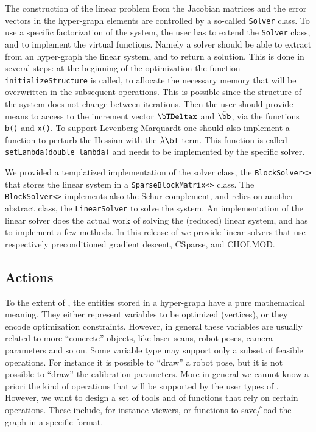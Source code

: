 \documentclass[a4paper]{article}
\begin{document}
The construction of the linear problem from the Jacobian matrices and the error vectors
in the hyper-graph elements are controlled by a so-called \verb+Solver+ class.
To use a specific factorization of the system, the user has to extend the
\verb+Solver+ class, and to implement the virtual functions. 
Namely a solver should be able to extract from an
hyper-graph the linear system, and to return a solution.  This is
done in several steps: at the beginning of the optimization the
function \verb+initializeStructure+ is called, to allocate the
necessary memory that will be overwritten in the subsequent
operations. This is possible since the structure of the system does
not change between iterations. Then the user should provide means to
access to the increment vector $\bTDeltax$ and $\tilde \bb$, via the
functions \verb+b()+ and \verb+x()+. To support Levenberg-Marquardt
one should also implement a function to perturb the Hessian with the
$\lambda \bI$ term. This function is called
\verb+setLambda(double lambda)+ and needs to be implemented by the
specific solver.

We provided a templatized implementation of the solver class, the
\verb+BlockSolver<>+ that stores the linear system in a
\verb+SparseBlockMatrix<>+ class. The \verb+BlockSolver<>+ implements
also the Schur complement, and relies on another abstract class, the
\verb+LinearSolver+ to solve the system.
An implementation of the linear solver does the actual work
of solving the (reduced) linear system, and has to implement a few methods.
In this release of \gopt{} we provide linear solvers that use respectively
preconditioned gradient descent, CSparse, and CHOLMOD.


\subsection{Actions}
To the extent of \gopt{}, the entities stored in a hyper-graph have a
pure mathematical meaning. They either represent variables to be
optimized (vertices), or they encode optimization constraints.
However, in general these variables are usually related to more
``concrete'' objects, like laser scans, robot poses, camera parameters
and so on.  Some variable type may support only a subset of feasible
operations.  For instance it is possible to ``draw'' a robot pose, but
it is not possible to ``draw'' the calibration parameters.  More in
general we cannot know a priori the kind of operations that will be
supported by the user types of \gopt.  However, we want to design a set
of tools and of functions that rely on certain operations. These include,
for instance viewers, or functions to save/load the graph in a specific format.
\end{document}
